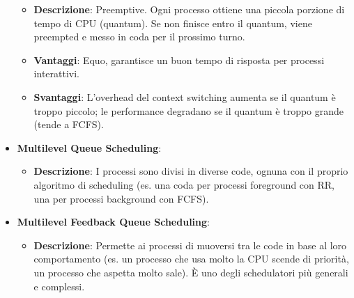 \begin{itemize}
    \begin{itemize}
        \item \textbf{Descrizione}: Preemptive. Ogni processo ottiene una piccola porzione di tempo di CPU (quantum). Se non finisce entro il quantum, viene preempted e messo in coda per il prossimo turno.
        \item \textbf{Vantaggi}: Equo, garantisce un buon tempo di risposta per processi interattivi.
        \item \textbf{Svantaggi}: L'overhead del context switching aumenta se il quantum è troppo piccolo; le performance degradano se il quantum è troppo grande (tende a FCFS).
    \end{itemize}
    \item \textbf{Multilevel Queue Scheduling}:
    \begin{itemize}
        \item \textbf{Descrizione}: I processi sono divisi in diverse code, ognuna con il proprio algoritmo di scheduling (es. una coda per processi foreground con RR, una per processi background con FCFS).
    \end{itemize}
    \item \textbf{Multilevel Feedback Queue Scheduling}:
    \begin{itemize}
        \item \textbf{Descrizione}: Permette ai processi di muoversi tra le code in base al loro comportamento (es. un processo che usa molto la CPU scende di priorità, un processo che aspetta molto sale). È uno degli schedulatori più generali e complessi.
    \end{itemize}
\end{itemize}